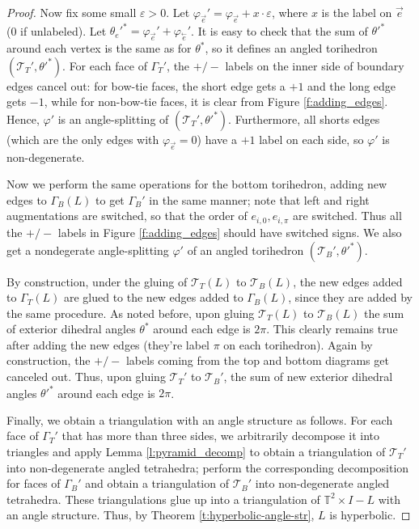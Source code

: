 \documentclass[11pt]{amsart}
\newcommand{\thmref}[1]{Theorem \ref{#1}}
\newcommand{\lemref}[1]{Lemma \ref{#1}}
\newcommand{\figref}[1]{Figure \ref{#1}}
\newcommand{\torus}{{\mathbb{T}^2}}
\newcommand{\sT}{{\mathcal{T}}}
\newcommand{\cev}[1]{\overset{\leftarrow}{#1}}
\newcommand{\vphi}{\varphi}
\newcommand{\veps}{\varepsilon}
\newcommand{\toruscomp}[1]{{\torus \times I - #1}}
\theoremstyle{plain}
\theoremstyle{definition}
\begin{document}
\begin{proof}
Now fix some small $\veps > 0$.
Let $\vphi_{\vec{e}}' = \vphi_{\vec{e}} + x \cdot \veps$,
where $x$ is the label on $\vec{e}$ (0 if unlabeled).
Let $\theta_e'^* = \vphi_{\vec{e}}' + \vphi_{\cev{e}}'$.
It is easy to check that the sum of $\theta'^*$
around each vertex is the same as for $\theta^*$,
so it defines an angled torihedron $(\sT_T',\theta'^*)$.
For each face of $\Gamma_T'$, the $+/-$ labels
on the inner side of boundary edges cancel out:
for bow-tie faces, the short edge gets a $+1$ and the long edge
gets $-1$, while for non-bow-tie faces,
it is clear from \figref{f:adding_edges}.
Hence, $\vphi'$ is an angle-splitting of $(\sT_T',\theta'^*)$.
Furthermore, all shorts edges
(which are the only edges with $\vphi_{\vec{e}} = 0$)
have a $+1$ label on each side,
so $\vphi'$ is non-degenerate.


Now we perform the same operations for the bottom torihedron,
adding new edges to $\Gamma_B(L)$ to get $\Gamma_B'$
in the same manner;
note that left and right augmentations are switched,
so that the order of $e_{i,0},e_{i,\pi}$ are switched.
Thus all the $+/-$ labels in \figref{f:adding_edges}
should have switched signs.
We also get a nondegerate angle-splitting $\vphi'$
of an angled torihedron $(\sT_B',\theta'^*)$.


By construction, under the gluing of
$\sT_T(L)$ to $\sT_B(L)$,
the new edges added to $\Gamma_T(L)$
are glued to the new edges added to $\Gamma_B(L)$,
since they are added by the same procedure.
As noted before, upon gluing $\sT_T(L)$ to $\sT_B(L)$
the sum of exterior dihedral angles $\theta^*$ around each edge
is $2\pi$.
This clearly remains true after adding the new edges
(they're label $\pi$ on each torihedron).
Again by construction,
the $+/-$ labels coming from the top and bottom diagrams get canceled out.
Thus, upon gluing $\sT_T'$ to $\sT_B'$,
the sum of new exterior dihedral angles $\theta'^*$ around each edge
is $2\pi$.


Finally, we obtain a triangulation with an angle structure as follows.
For each face of $\Gamma_T'$ that has more than three sides,
we arbitrarily decompose it into triangles
and apply \lemref{l:pyramid_decomp}
to obtain a triangulation of $\sT_T'$ into non-degenerate angled tetrahedra;
perform the corresponding decomposition for faces of
$\Gamma_B'$ and obtain a triangulation of $\sT_B'$
into non-degenerate angled tetrahedra.
These triangulations glue up into a triangulation of $\toruscomp{L}$
with an angle structure.
Thus, by \thmref{t:hyperbolic-angle-str},
$L$ is hyperbolic.
\end{proof}
\end{document}

